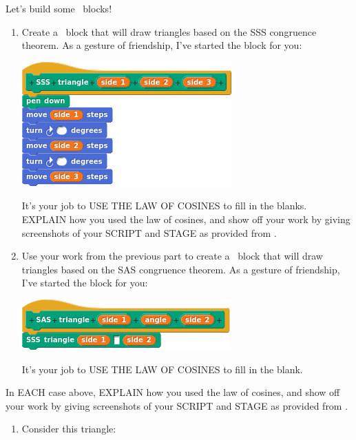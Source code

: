 \documentclass[noauthor,nooutcomes,handout]{ximera}
\begin{document}
\begin{question}
  Let's build some \snap\ blocks!
  \begin{enumerate}
  \item Create a \snap\ block that will draw triangles based on the
    SSS congruence theorem.  As a gesture of friendship, I've started
    the block for you:
    \begin{center}
      \includegraphics{sssBlockBLANK}
    \end{center}
    It's your job to USE THE LAW OF COSINES to fill in the
    blanks. EXPLAIN how you used the law of cosines, and show off your
    work by giving screenshots of your SCRIPT and STAGE as provided
    from \snap.
  \item Use your work from the previous part to create a \snap\ block
    that will draw triangles based on the SAS congruence theorem.  As
    a gesture of friendship, I've started the block for you:
    \begin{center}
      \includegraphics{sasBlockBLANK}
    \end{center}
    It's your job to USE THE LAW OF COSINES to fill in the
    blank.
  \end{enumerate}
    In EACH case above, EXPLAIN how you used the law of cosines, and
    show off your work by giving screenshots of your SCRIPT and STAGE
    as provided from \snap.
    \begin{freeResponse}
      \begin{enumerate}
      \item Consider this triangle:
        \begin{center}
\end{center}
\end{enumerate}
\end{freeResponse}
\end{question}
\end{document}
